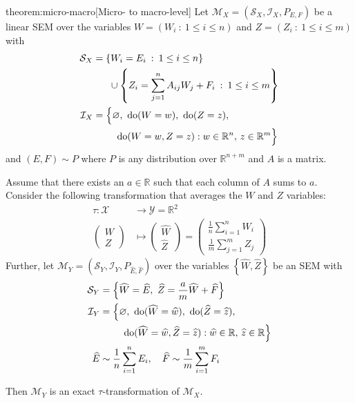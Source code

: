 \begin{reptheorem}{theorem:micro-macro}[Micro- to macro-level]
Let ${\mathcal{M}_X = \left(\mathcal{S}_X, \mathcal{I}_X, P_{E,F} \right)}$ be a linear SEM over the variables ${W=\left( W_i \: : \: 1\leq  i \leq n \right)}$ and ${Z=\left( Z_i \: : \: 1\leq  i \leq m \right)}$ with
%
\begin{align*}
\mathcal{S}_X &= \left\lbrace W_i = E_i \:  : \: 1 \leq i \leq n  \right\rbrace \\
& \quad \ \  \cup \left\lbrace Z_i = \sum_{j=1}^n A_{ij}W_j  + F_{i} \:  : \: 1\leq i \leq m \right\rbrace \\
%
\mathcal{I}_X &= \Big{\{} \nulli, \ \doop(W= w), \ \doop(Z= z), \\
& \qquad\ \doop(W= w, Z= z ) :   w \in \mathbb{R}^{n}, \, z \in \mathbb{R}^m \Big{\}}
%
\end{align*}
%
and $(E,F)  \sim P$ where $P$ is any distribution over $\mathbb{R}^{n+m}$ and $A$ is a matrix.

Assume that there exists an $a\in \mathbb{R}$ such that each column of $A$ sums to $a$. Consider the following transformation that averages the $W$ and $Z$ variables:
%
\begin{align*}
\tau : \mathcal{X} &\rightarrow \mathcal{Y} = \mathbb{R}^2 \\
\begin{pmatrix} W \\ Z \end{pmatrix} &\mapsto \begin{pmatrix} \widehat{W} \\ \widehat{Z} \end{pmatrix} = \begin{pmatrix} \frac{1}{n}\sum_{i=1}^n W_i \\ \frac{1}{m}\sum_{j=1}^m Z_j  \end{pmatrix}
\end{align*}
%
Further, let $\mathcal{M}_Y = \left(\mathcal{S}_Y, \mathcal{I}_Y, P_{\widehat{E},\widehat{F}} \right)$ over the variables ${\left\lbrace \widehat{W}, \widehat{Z} \right\rbrace}$ be an SEM with
%
\begin{align*}
\mathcal{S}_Y &= \Big\lbrace \widehat{W} = \widehat{E}, \ \widehat{Z} = \frac{a}{m}\widehat{W} + \widehat{F} \Big\rbrace \\
%
\mathcal{I}_Y &= \Big{\{} \nulli,\ \doop(\widehat{W}= \widehat{w}), \ \doop(\widehat{Z}= \widehat{z}), \\
& \qquad\ \doop(\widehat{W}= \widehat{w}, \widehat{Z}= \widehat{z} ) :   \widehat{w} \in \mathbb{R}, \, \widehat{z} \in \mathbb{R} \Big{\}} \\
%
\widehat{E}  & \sim \frac{1}{n}\sum_{i=1}^{n} E_i, \quad
\widehat{F}  \sim \frac{1}{m}\sum_{i=1}^{m} F_i
\end{align*}

Then $\mathcal{M}_Y$ is an exact $\tau$-transformation of $\mathcal{M}_X$.
\end{reptheorem}

